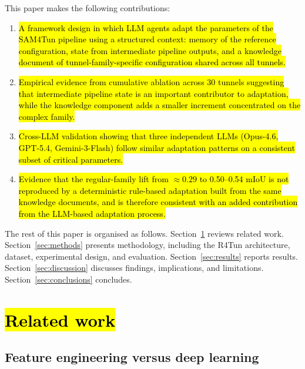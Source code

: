 \documentclass[a4paper,fleqn]{cas-dc}
\begin{document}
{This paper makes the following contributions:
\begin{enumerate}
\item \hl{A framework design in which LLM agents adapt the parameters of the SAM4Tun pipeline using a structured context: memory of the reference configuration, state from intermediate pipeline outputs, and a knowledge document of tunnel-family-specific configuration shared across all tunnels.}
\item \hl{Empirical evidence from cumulative ablation across 30 tunnels suggesting that intermediate pipeline state is an important contributor to adaptation, while the knowledge component adds a smaller increment concentrated on the complex family.}
\item \hl{Cross-LLM validation showing that three independent LLMs (Opus-4.6, GPT-5.4, Gemini-3-Flash) follow similar adaptation patterns on a consistent subset of critical parameters.}
\item \hl{Evidence that the regular-family lift from $\approx 0.29$ to 0.50--0.54 mIoU is not reproduced by a deterministic rule-based adaptation built from the same knowledge documents, and is therefore consistent with an added contribution from the LLM-based adaptation process.}
\end{enumerate}

The rest of this paper is organised as follows. Section~\ref{sec:related} reviews related work. Section~\ref{sec:methods} presents methodology, including the R4Tun architecture, dataset, experimental design, and evaluation. Section~\ref{sec:results} reports results. Section~\ref{sec:discussion} discusses findings, implications, and limitations. Section~\ref{sec:conclusions} concludes.

\section{\hl{Related work}}\label{sec:related}

\subsection{Feature engineering versus deep learning}

}
\end{document}

